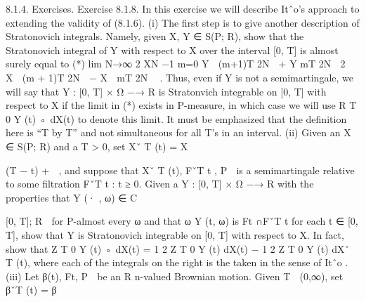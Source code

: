 \documentclass{scrartcl}
\begin{document}



8.1.4. Exercises.
Exercise 8.1.8. In this exercise we will describe Itˆo’s approach to extending the validity of (8.1.6).
(i) The first step is to give another description of Stratonovich integrals.
Namely, given X, Y ∈ S(P; R), show that the Stratonovich integral of Y
with respect to X over the interval [0, T] is almost surely equal to
(*) lim
N→∞
2
XN −1
m=0
Y

(m+1)T
2N

+ Y
 mT
2N

2

X

(m + 1)T
2N

− X

mT
2N
 .
Thus, even if Y is not a semimartingale, we will say that Y : [0, T] × Ω −→
R is Stratonvich integrable on [0, T] with respect to X if the limit in (*)
exists in P-measure, in which case we will use R T
0
Y (t) ◦ dX(t) to denote this
limit. It must be emphasized that the definition here is “T by T” and not
simultaneous for all T’s in an interval.
(ii) Given an X ∈ S(P; R) and a T > 0, set Xˇ T
(t) = X

(T − t)
+

, and
suppose that
Xˇ T
(t), FˇT
t
, P

is a semimartingale relative to some filtration
{FˇT
t
: t ≥ 0}. Given a Y : [0, T] × Ω −→ R with the properties that
Y (· , ω) ∈ C

[0, T]; R

for P-almost every ω and that ω Y (t, ω) is Ft ∩FˇT
t
for each t ∈ [0, T], show that Y is Stratonovich integrable on [0, T] with
respect to X. In fact, show that
Z T
0
Y (t) ◦ dX(t) = 1
2
Z T
0
Y (t) dX(t) −
1
2
Z T
0
Y (t) dXˇ T
(t),
where each of the integrals on the right is the taken in the sense of Itˆo .
(iii) Let
β(t), Ft, P

be an R
n-valued Brownian motion. Given T ∈
(0,∞), set βˇT
(t) = β
\end{document}
